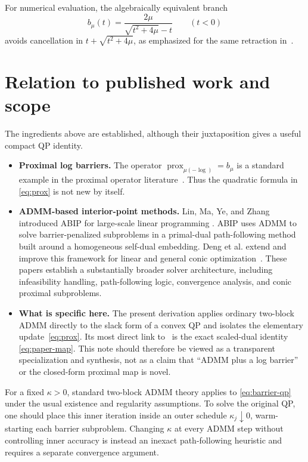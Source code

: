 \documentclass[9pt]{extarticle}
\newcommand{\prox}{\operatorname{prox}}
\begin{document}
For numerical evaluation, the algebraically equivalent branch
\begin{equation}
 b_\mu(t)=\frac{2\mu}{\sqrt{t^2+4\mu}-t}\qquad(t<0)
\end{equation}
avoids cancellation in $t+\sqrt{t^2+4\mu}$, as emphasized for the same retraction
in~\cite{arrizabalaga2026,arrizabalaga2026implicit}.

\section{Relation to published work and scope}

The ingredients above are established, although their juxtaposition gives a useful
compact QP identity.
\begin{itemize}
\item \textbf{Proximal log barriers.}
The operator $\prox_{\mu(-\log)}=b_\mu$ is a standard example in the proximal
operator literature~\cite{parikh2014}.  Thus the quadratic formula in
\eqref{eq:prox} is not new by itself.

\item \textbf{ADMM-based interior-point methods.}
Lin, Ma, Ye, and Zhang introduced ABIP for large-scale linear programming
\cite{lin2021}.  ABIP uses ADMM to solve barrier-penalized subproblems in a
primal-dual path-following method built around a homogeneous self-dual embedding.
Deng et al. extend and improve this framework for linear and general conic
optimization~\cite{deng2025}.  These papers establish a substantially broader solver
architecture, including infeasibility handling, path-following logic, convergence
analysis, and conic proximal subproblems.

\item \textbf{What is specific here.}
The present derivation applies ordinary two-block ADMM directly to the slack form of
a convex QP and isolates the elementary update~\eqref{eq:prox}.  Its most direct link
to~\cite{arrizabalaga2026,arrizabalaga2026implicit} is the exact scaled-dual identity
\eqref{eq:paper-map}.  This note should therefore be viewed as a transparent
specialization and synthesis, not as a claim that ``ADMM plus a log barrier'' or the
closed-form proximal map is novel.
\end{itemize}

For a fixed $\kappa>0$, standard two-block ADMM theory applies to
\eqref{eq:barrier-qp} under the usual existence and regularity assumptions.  To solve
the original QP, one should place this inner iteration inside an outer schedule
$\kappa_j\downarrow0$, warm-starting each barrier subproblem.  Changing $\kappa$ at
every ADMM step without controlling inner accuracy is instead an inexact
path-following heuristic and requires a separate convergence argument.
\end{document}
